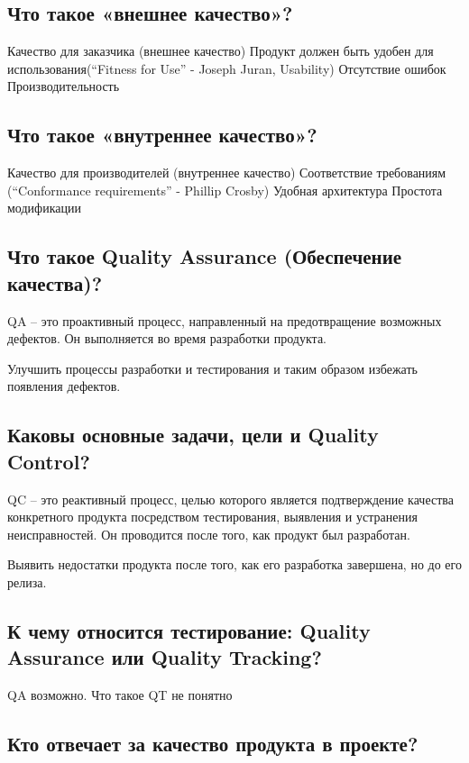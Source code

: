 \subsection{Что такое «внешнее качество»? }

Качество для заказчика (внешнее качество)
Продукт должен быть удобен для использования (“Fitness for Use” -
Joseph Juran, Usability)
Отсутствие ошибок
Производительность

\subsection{Что такое «внутреннее качество»? }

Качество для производителей (внутреннее качество)
Соответствие требованиям (“Conformance requirements” - Phillip Crosby)
Удобная архитектура
Простота модификации

\subsection{Что такое Quality Assurance (Обеспечение качества)?}

 QA – это проактивный процесс, направленный на предотвращение возможных
 дефектов. Он выполняется во время разработки продукта. 

 Улучшить процессы разработки и тестирования и таким образом избежать появления
 дефектов. 

\subsection{Каковы основные задачи, цели и Quality Control?}

QC – это реактивный процесс, целью которого является подтверждение качества
конкретного продукта посредством тестирования, выявления и устранения
неисправностей. Он проводится после того, как продукт был разработан. 

Выявить недостатки продукта после того, как его разработка завершена, но до его
релиза. 

\subsection{К чему относится тестирование: Quality Assurance или Quality
Tracking?}

QA возможно. Что такое QT не понятно

\subsection{Кто отвечает за качество продукта в проекте? }

